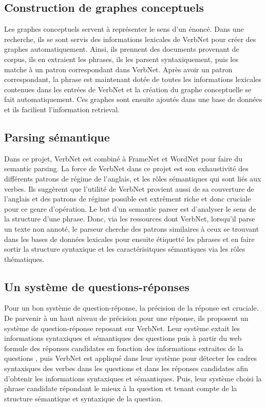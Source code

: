 \subsection{Construction de graphes conceptuels}
\citep{HensmanAutomaticallyBuildingConceptual2004}
Les graphes conceptuels servent à représenter le sens d'un énoncé. Dans une recherche, ils se sont servis des informations lexicales de VerbNet pour créer des graphes automatiquement. Ainsi, ils prennent des documents provenant de corpus, ils en extraient les phrases, ils les parsent syntaxiquement, puis les matche à un patron correspondant dans VerbNet. Après avoir un patron correspondant, la phrase est maintenant dotée de toutes les informations lexicales contenues dans les entrées de VerbNet et la création du graphe conceptuelle se fait automatiquement. Ces graphes sont ensuite ajoutés dans une base de données et ils facilient l'information retrieval.

\subsection{Parsing sémantique}
\citep{Shi:2005:PPT:2132047.2132058}
Dans ce projet, VerbNet est combiné à FrameNet et WordNet pour faire du semantic parsing. La force de VerbNet dans ce projet est son exhaustivité des différents patrons de régime de l'anglais, et les rôles sémantiques qui sont liés aux verbes. Ils suggèrent que l'utilité de VerbNet provient aussi de sa couverture de l'anglais et des patrons de régime possible est extrêment riche et donc cruciale pour ce genre d'opération. Le but d'un semantic parser est d'analyser le sens de la structure d'une phrase. Donc, via les ressources dont VerbNet, lorsqu'il parse un texte non annoté, le parseur cherche des patrons similaires à ceux se trouvant dans les bases de données lexicales pour ensuite étiquetté les phrases et en faire sortir la structure syntaxique et les caractérisitques sémantiques via les rôles thématiques.

\subsection{Un système de questions-réponses}
\citep{DBLP:conf/nlpke/WenJH08}
Pour un bon système de question-réponse, la précision de la réponse est cruciale. De parvenir à un haut niveau de précision pour une réponse, ils proposent un système de question-réponse reposant sur VerbNet. Leur système extait les informations syntaxiques et sémantiques des questions puis à partir du web formule des réponses candidates en fonction des informations extraites de la questions , puis VerbNet est appliqué dans leur système pour détecter les cadres syntaxiques des verbes dans les questions et dans les réponses candidates afin d'obtenir les informations syntaxiques et sémantiques. Puis, leur système choisi la phrase candidate répondant le mieux à la question et tenant compte de la structure sémantique et syntaxique de la question.

